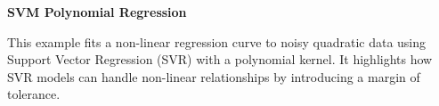 \documentclass[12pt,letter]{article}
\begin{document}
\begin{example}
\textbf{SVM Polynomial Regression}

This example fits a non-linear regression curve to noisy quadratic data using Support Vector Regression (SVR) with a polynomial kernel. It highlights how SVR models can handle non-linear relationships by introducing a margin of tolerance.
\end{example}

\pagebreak










\end{document}
